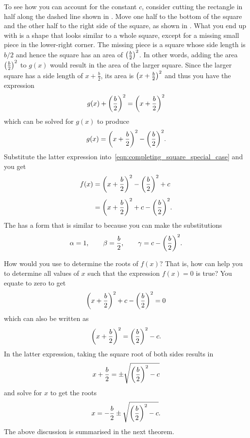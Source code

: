 \documentclass[a4paper,oneside,12pt]{article}
\begin{document}
To see how you can account for the constant $c$, consider cutting the
rectangle in half along the dashed line shown in
.  Move one
half to the bottom of the square and the other half to the right side
of the square, as shown in
.  What you end up
with is a shape that looks similar to a whole square, except for a
missing small piece in the lower-right corner.  The missing piece is a
square whose side length is $b/2$ and hence the square has an area of
$\parenthesis*{\frac{b}{2}}^2$.  In other words, adding the area
$\parenthesis*{\frac{b}{2}}^2$ to $g(x)$ would result in the area of
the larger square.  Since the larger square has a side length of
$x + \frac{b}{2}$, its area is $\parenthesis*{x + \frac{b}{2}}^2$ and
thus you have the expression
\[
g(x) + \parenthesis*{\frac{b}{2}}^2
=
\parenthesis*{x + \frac{b}{2}}^2
\]
which can be solved for $g(x)$ to produce
\[
g(x)
=
\parenthesis*{x + \frac{b}{2}}^2
-
\parenthesis*{\frac{b}{2}}^2.
\]
Substitute the latter expression
into~\eqref{eqn:completing_square_special_case} and you get
\begin{equation}
\label{eqn:completing_square_special_case_squared}
\begin{aligned}
f(x)
&=
\parenthesis*{x + \frac{b}{2}}^2
-
\parenthesis*{\frac{b}{2}}^2
+
c \\[4pt]
&=
\parenthesis*{x + \frac{b}{2}}^2
+
c
-
\parenthesis*{\frac{b}{2}}^2.
\end{aligned}
\end{equation}
The  has a form
that is similar to 
because you can make the substitutions
\[
\alpha
=
1,
\qquad
\beta
=
\frac{b}{2},
\qquad
\gamma
=
c
-
\parenthesis*{\frac{b}{2}}^2.
\]

How would you use
 to determine
the roots of $f(x)$?  That is, how can
 help you to
determine all values of $x$ such that the expression
$f(x) = 0$ is true?  You equate
 to zero to get
\[
\parenthesis*{x + \frac{b}{2}}^2
+
c
-
\parenthesis*{\frac{b}{2}}^2
=
0
\]
which can also be written as
\[
\parenthesis*{x + \frac{b}{2}}^2
=
\parenthesis*{\frac{b}{2}}^2 - c.
\]
In the latter expression, taking the square root of both sides results
in
\[
x + \frac{b}{2}
=
\pm
\sqrt{
  \parenthesis*{\frac{b}{2}}^2 - c
}
\]
and solve for $x$ to get the roots
\[
x
=
-\frac{b}{2}
\pm
\sqrt{
  \parenthesis*{\frac{b}{2}}^2 - c
}.
\]
The above discussion is summarised in the next theorem.
\end{document}
